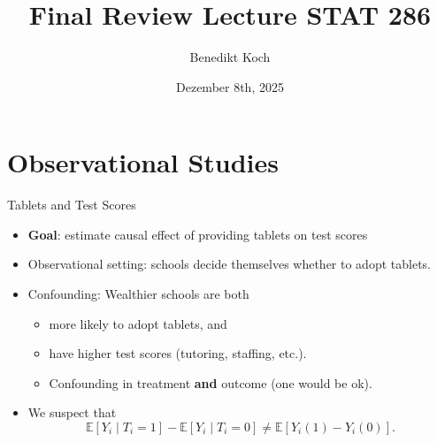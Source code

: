 \documentclass[10pt]{beamer}
\title{Final Review Lecture STAT 286}
\author{Benedikt Koch}
\date{Dezember 8th, 2025}
\theoremstyle{plain}
\begin{document}
\begin{frame}[plain]

  \maketitle

\end{frame}




\section{Observational Studies}

\begin{frame}{Tablets and Test Scores}
  \begin{itemize}
    \item \textbf{Goal}: estimate causal effect of providing tablets on test scores
    \pause
    \item Observational setting: schools decide themselves whether to adopt tablets.
    \pause
    \item Confounding: Wealthier schools are both
    \begin{itemize}
      \item more likely to adopt tablets, and
      \item have higher test scores (tutoring, staffing, etc.).
      \item Confounding in treatment \textbf{and} outcome (one would be ok).
    \end{itemize}
    \pause
    \item We suspect that
    \[
      \mathbb{E}[Y_i \mid T_i=1] - \mathbb{E}[Y_i \mid T_i=0] \neq \mathbb{E}[Y_i(1)-Y_i(0)].
    \]
  \end{itemize}
\end{frame}
\end{document}
